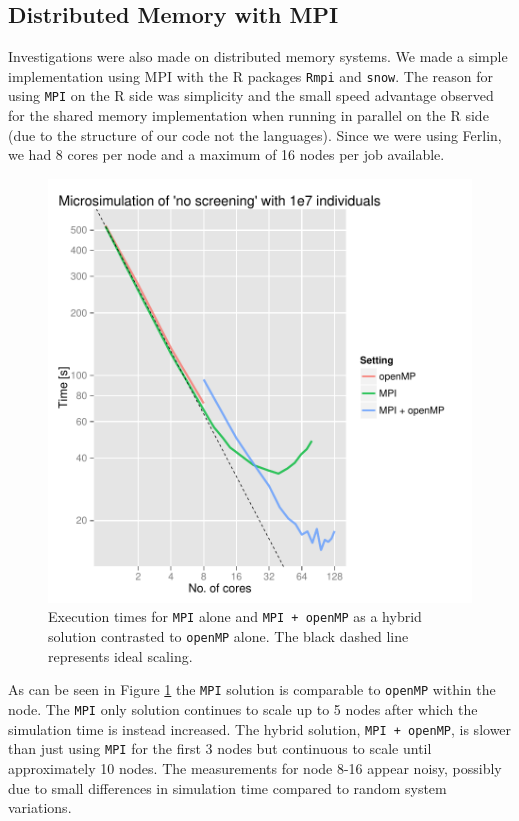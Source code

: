 \subsection{Distributed Memory with MPI}

Investigations were also made on distributed memory
systems. We made a simple implementation using MPI with the R packages \texttt{Rmpi} and
\texttt{snow}. The reason for using \texttt{MPI} on the R side was
simplicity and the small speed advantage observed for the shared memory
implementation when running in parallel on the R side (due to the structure of our
code not the languages). Since we were using Ferlin, we had 8 cores per node
and a maximum of 16 nodes per job available.

\begin{figure}[!htbp] \centering
  \includegraphics[height=0.5\textheight]{images/multiNodeProfiling.pdf}
  \caption{Execution times for \texttt{MPI} alone and \texttt{MPI +
      openMP} as a hybrid solution contrasted to \texttt{openMP}
    alone. The black dashed line represents ideal scaling.}
  \label{fig:multiNode}
\end{figure} 

As can be seen in Figure \ref{fig:multiNode} the \texttt{MPI} solution
is comparable to \texttt{openMP} within the node. The \texttt{MPI}
only solution continues to scale up to 5 nodes after which the
simulation time is instead increased. The hybrid solution, \texttt{MPI
+ openMP}, is slower than just using \texttt{MPI} for the first 3
nodes but continuous to scale until approximately 10 nodes. The
measurements for node 8-16 appear noisy, possibly due to small
differences in simulation time compared to random system
variations.

